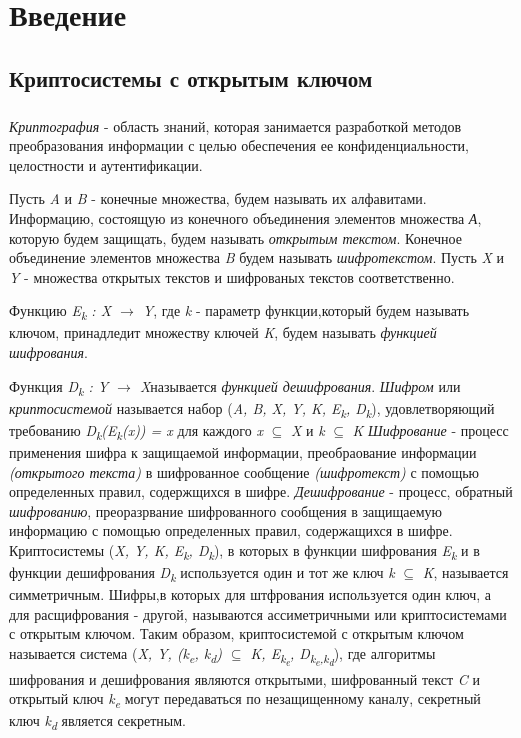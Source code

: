 \newpage
\chapter{Введение}

\section{Криптосистемы с открытым ключом}
\paragraph{} \textit{Криптография} - область знаний, которая занимается разработкой методов преобразования информации с целью обеспечения ее 
конфиденциальности, целостности и аутентификации.

  Пусть \textit{A} и \textit{B}  - конечные множества, будем называть их алфавитами. Информацию, состоящую из конечного объединения элементов 
множества \textit{А}, которую будем защищать, будем называть \textit{открытым текстом}. Конечное объединение элементов множества \textit{B} будем 
называть \textit{шифротекстом}. Пусть \textit{X} и \textit{Y} - множества открытых текстов и шифрованых текстов соответственно.

  Функцию \textit{E\textsubscript{k} : \textit{X} {$\rightarrow$} \textit{Y}}, где \textit{k} - параметр функции,который будем называть ключом, 
принадледит множеству ключей \textit{K}, будем называть \textit{функцией шифрования}. 

  Функция \textit{D\textsubscript{k} : \textit{Y} {$\rightarrow$} \textit{X}}называется \textit{функцией дешифрования}.
  \textit{Шифром} или \textit{криптосистемой} называется набор (\textit{A, B, X, Y, K, E\textsubscript{k}, D\textsubscript{k}}), удовлетворяющий 
требованию \textit{D\textsubscript{k}(E\textsubscript{k}(x)) = x} для каждого \textit{x} {$\subseteq$} \textit{X} и \textit{k} {$\subseteq$} \textit{K}
  \textit{Шифрование} - процесс применения шифра к защищаемой информации, преобраование информации \textit{(открытого текста)} в шифрованное сообщение 
\textit{(шифротекст)} с помощью определенных правил, содержщихся в шифре.
  \textit{Дешифрование} - процесс, обратный \textit{шифрованию}, преоразрвание шифрованного сообщения в защищаемую информацию с помощью определенных 
правил, содержащихся в шифре.
  Криптосистемы (\textit{X, Y, K, E\textsubscript{k}, D\textsubscript{k}}), в которых в функции шифрования \textit{E\textsubscript{k}} и в функции 
дешифрования \textit{D\textsubscript{k}} используется один и тот же ключ \textit{k} {$\subseteq$} \textit{K}, называется симметричным. Шифры,в которых 
для штфрования используется один ключ, а для расщифрования - другой, называются ассиметричными или криптосистемами с открытым ключом. Таким образом, 
криптосистемой с открытым ключом называется система 
(\textit{X, Y, (k\textsubscript{e}, k\textsubscript{d}) {$\subseteq$} K, E\textsubscript{k\textsubscript{e}}, D\textsubscript{k\textsubscript{e},k\textsubscript{d}}}), 
где алгоритмы шифрования и дешифрования являются открытыми, шифрованный текст \textit{C} и открытый ключ \textit{k\textsubscript{e}} могут 
передаваться по незащищенному каналу, секретный ключ \textit{k\textsubscript{d}} является секретным.

